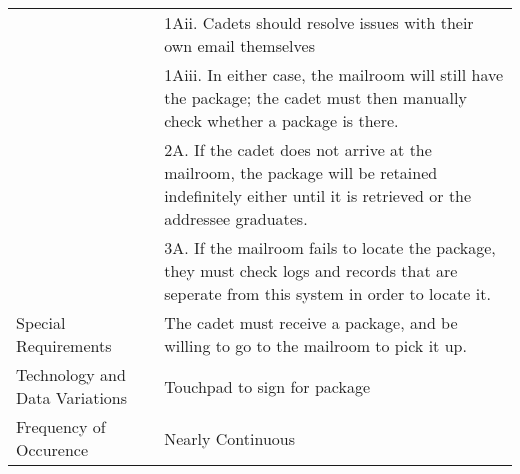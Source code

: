 \documentclass[11pt]{article}
\begin{document}
\begin{table}[tbp]
\begin{tabularx}{1.5\textwidth}{|X|X|}
& 1Aii. Cadets should resolve issues with their own email themselves \\
& 1Aiii. In either case, the mailroom will still have the package; the cadet must then manually check whether a package is there. \\
& 2A. If the cadet does not arrive at the mailroom, the package will be retained indefinitely either until it is retrieved or the addressee graduates. \\
& 3A. If the mailroom fails to locate the package, they must check logs and records that are seperate from this system in order to locate it. \\
\hline Special Requirements & The cadet must receive a package, and be willing to go to the mailroom to pick it up. \\
\hline Technology and Data Variations & Touchpad to sign for package \\
\hline Frequency of Occurence & Nearly Continuous \\
\hline
\end{tabularx}\end{table}
\end{document}
